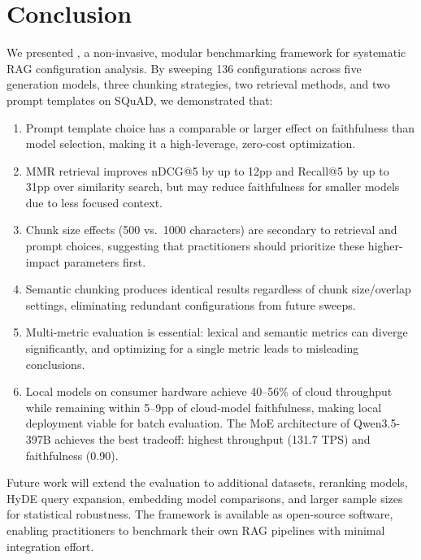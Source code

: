 \section{Conclusion}
\label{sec:conclusion}

We presented \toolname{}, a non-invasive, modular benchmarking framework for systematic RAG configuration analysis. By sweeping 136 configurations across five generation models, three chunking strategies, two retrieval methods, and two prompt templates on SQuAD, we demonstrated that:

\begin{enumerate}
  \item Prompt template choice has a comparable or larger effect on faithfulness than model selection, making it a high-leverage, zero-cost optimization.
  \item MMR retrieval improves nDCG@5 by up to 12pp and Recall@5 by up to 31pp over similarity search, but may reduce faithfulness for smaller models due to less focused context.
  \item Chunk size effects (500 vs.\ 1000 characters) are secondary to retrieval and prompt choices, suggesting that practitioners should prioritize these higher-impact parameters first.
  \item Semantic chunking produces identical results regardless of chunk size/overlap settings, eliminating redundant configurations from future sweeps.
  \item Multi-metric evaluation is essential: lexical and semantic metrics can diverge significantly, and optimizing for a single metric leads to misleading conclusions.
  \item Local models on consumer hardware achieve 40--56\% of cloud throughput while remaining within 5--9pp of cloud-model faithfulness, making local deployment viable for batch evaluation. The MoE architecture of Qwen3.5-397B achieves the best tradeoff: highest throughput (131.7 TPS) and faithfulness (0.90).
\end{enumerate}

Future work will extend the evaluation to additional datasets, reranking models, HyDE query expansion, embedding model comparisons, and larger sample sizes for statistical robustness. The framework is available as open-source software, enabling practitioners to benchmark their own RAG pipelines with minimal integration effort.



